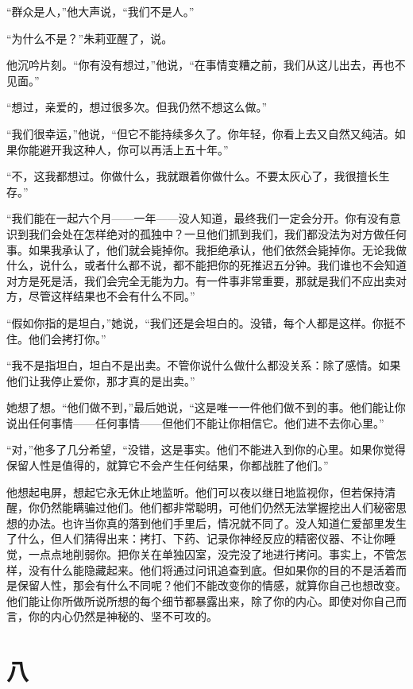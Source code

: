 ``群众是人，''他大声说，``我们不是人。''

``为什么不是？''朱莉亚醒了，说。

他沉吟片刻。``你有没有想过，''他说，``在事情变糟之前，我们从这儿出去，再也不见面。''

``想过，亲爱的，想过很多次。但我仍然不想这么做。''

``我们很幸运，''他说，``但它不能持续多久了。你年轻，你看上去又自然又纯洁。如果你能避开我这种人，你可以再活上五十年。''

``不，这我都想过。你做什么，我就跟着你做什么。不要太灰心了，我很擅长生存。''

``我们能在一起六个月——一年——没人知道，最终我们一定会分开。你有没有意识到我们会处在怎样绝对的孤独中？一旦他们抓到我们，我们都没法为对方做任何事。如果我承认了，他们就会毙掉你。我拒绝承认，他们依然会毙掉你。无论我做什么，说什么，或者什么都不说，都不能把你的死推迟五分钟。我们谁也不会知道对方是死是活，我们会完全无能为力。有一件事非常重要，那就是我们不应出卖对方，尽管这样结果也不会有什么不同。''

``假如你指的是坦白，''她说，``我们还是会坦白的。没错，每个人都是这样。你挺不住。他们会拷打你。''

``我不是指坦白，坦白不是出卖。不管你说什么做什么都没关系：除了感情。如果他们让我停止爱你，那才真的是出卖。''

她想了想。``他们做不到，''最后她说，``这是唯一一件他们做不到的事。他们能让你说出任何事情——任何事情——但他们不能让你相信它。他们进不去你心里。''

``对，''他多了几分希望，``没错，这是事实。他们不能进入到你的心里。如果你觉得保留人性是值得的，就算它不会产生任何结果，你都战胜了他们。''

他想起电屏，想起它永无休止地监听。他们可以夜以继日地监视你，但若保持清醒，你仍然能瞒骗过他们。他们都非常聪明，可他们仍然无法掌握挖出人们秘密思想的办法。也许当你真的落到他们手里后，情况就不同了。没人知道仁爱部里发生了什么，但人们猜得出来：拷打、下药、记录你神经反应的精密仪器、不让你睡觉，一点点地削弱你。把你关在单独囚室，没完没了地进行拷问。事实上，不管怎样，没有什么能隐藏起来。他们将通过问讯追查到底。但如果你的目的不是活着而是保留人性，那会有什么不同呢？他们不能改变你的情感，就算你自己也想改变。他们能让你所做所说所想的每个细节都暴露出来，除了你的内心。即使对你自己而言，你的内心仍然是神秘的、坚不可攻的。

\section*{八}\label{ux5341ux516d}

